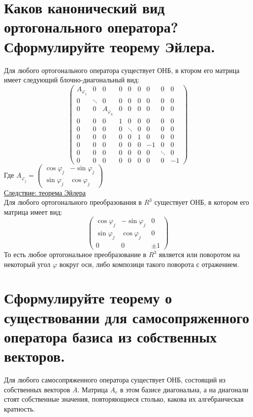 \documentclass{article}
\begin{document}
\section{Каков канонический вид ортогонального оператора? Сформулируйте теорему Эйлера.}
Для любого ортогонального оператора существует ОНБ, в ктором его матрица имеет
следующий блочно-диагональный вид:
\\
$$
\begin{pmatrix}
    A_{\varphi_1} & 0 & 0 & 0 & 0 & 0 & 0 & 0 & 0\\
    0 & \ddots & 0 & 0 & 0 & 0 & 0& 0 & 0\\
    0 & 0 & A_{\varphi_k} & 0 & 0 & 0 & 0 & 0 & 0\\
    0 & 0 & 0 & 1 & 0 & 0 & 0 & 0 & 0\\
    0 & 0 & 0 & 0 & \ddots & 0 & 0 & 0 & 0\\
    0 & 0 & 0 & 0 & 0 &  1 & 0 & 0 & 0\\
    0 & 0 & 0 & 0 & 0 & 0 & -1 & 0 & 0\\
    0 & 0 & 0 & 0 & 0 & 0 & 0 & \ddots & 0\\
    0 & 0 & 0 & 0 & 0 & 0 & 0 & 0 & -1
\end{pmatrix}
$$
Где $A_{\varphi_j} = 
\begin{pmatrix}
    \cos \varphi_j & -\sin \varphi_j\\
    \sin \varphi_j & \cos \varphi_j
\end{pmatrix}
$
\\
\underline{Следствие: теорема Эйлера}
\\
Для любого ортогонального преобразования в $R^3$
существует ОНБ, в котором его матрица имеет вид:
$$
\begin{pmatrix}
    \cos \varphi_j & -\sin \varphi_j & 0 \\
    \sin \varphi_j & \cos \varphi_j & 0\\
    0 & 0 & \pm 1 
\end{pmatrix}
$$
То есть любое ортогональное преобразование
в $R^3$ является или поворотом на некоторый угол
$\varphi$ вокруг оси, либо композици такого поворота с отражением.

\section{Сформулируйте теорему о существовании для самосопряженного оператора базиса из собственных векторов.}
Для любого самосопряженного оператора существует ОНБ, состоящий из собственных
векторов $A$. Матрица $A_e$ в этом базисе диагональна, а
на диагонали стоят собственные значения, повторяющиеся столько,
какова их алгебраическая кратность.
\end{document}
